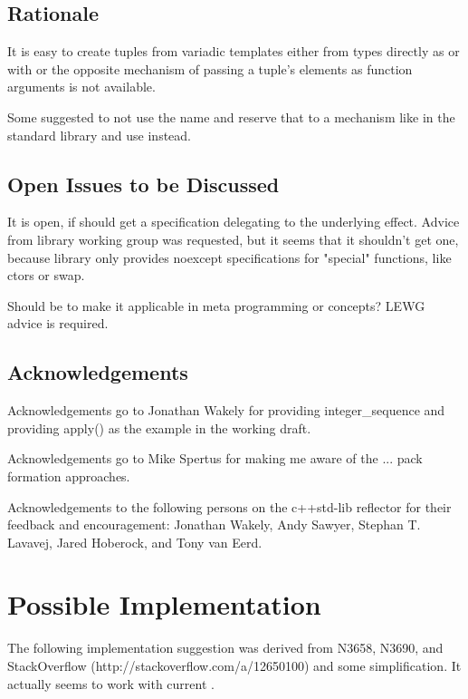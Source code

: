 \documentclass[ebook,11pt,article]{memoir}
\begin{document}
\section{Rationale}
It is easy to create tuples from variadic templates either from types directly as  or  with  or  the opposite mechanism of passing a tuple's elements as function arguments is not available.

Some suggested to not use the name and reserve that to a mechanism like \emph{} in the standard library and use  instead.

\section{Open Issues to be Discussed}
It is open, if  should get a  specification delegating to the underlying effect. Advice from library working group was requested, but it seems that it shouldn't get one, because library only provides noexcept specifications for "special" functions, like ctors or swap.

Should  be  to make it applicable in meta programming or concepts? LEWG advice is required.

\section{Acknowledgements}
Acknowledgements go to Jonathan Wakely for providing integer_sequence and providing apply() as the example in the working draft.

Acknowledgements go to Mike Spertus for making me aware of the ... pack formation approaches.

Acknowledgements to the following persons on the c++std-lib reflector for their feedback and encouragement: Jonathan Wakely, Andy Sawyer, Stephan T. Lavavej, Jared Hoberock, and Tony van Eerd.

\chapter{Possible Implementation}
The following implementation suggestion was derived from N3658, N3690, and StackOverflow (http://stackoverflow.com/a/12650100) and some simplification. It actually seems to work with current .
\end{document}
